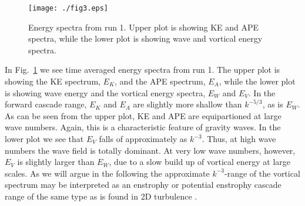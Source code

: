 \begin{figure}[h]
\centerline{\texttt{[image: ./fig3.eps]}}
 \caption{ Energy spectra from run 1. Upper plot is showing KE and APE spectra, while the lower plot is showing wave and vortical energy spectra. }
 \label{S1}
 \end{figure}


 In Fig.~\ref{S1} we see  time averaged energy spectra from run 1. The upper plot is
 showing the KE spectrum, $ E_K $,  and the APE spectrum, $ E_A$, while the lower plot
 is showing wave energy and the vortical energy spectra, $ E_W $ and $ E_V$.  In the
 forward cascade range, $ E_K $ and $ E_A $ are slightly more shallow than $ k^{-5/3} $,
 as is $ E_W $.  As can be seen from the upper plot, KE and APE are equipartioned at
 large wave numbers. Again, this is a characteristic feature of gravity waves. In the
 lower plot we see that $ E_V $  falls of approximately as $ k^{-3} $. Thus, at high
 wave numbers the wave field is totally dominant. At very low wave numbers, however, $
 E_V $ is slightly larger than $ E_W $, due to a slow build  up of vortical energy at
 large scales. { As we will argue in the following the approximate $ k^{-3} $-range of
 the vortical spectrum may be interpreted as an enstrophy or potential enstrophy cascade
 range of the same type as is found in 2D turbulence \citep{Kraichnan1967, Kraichnan1971}.}

